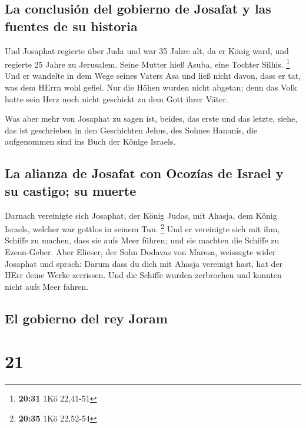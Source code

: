 \hypertarget{la-conclusiuxf3n-del-gobierno-de-josafat-y-las-fuentes-de-su-historia}{%
\subsection{La conclusión del gobierno de Josafat y las fuentes de su
historia}\label{la-conclusiuxf3n-del-gobierno-de-josafat-y-las-fuentes-de-su-historia}}

 Und Josaphat regierte über Juda und war 35 Jahre alt, da
er König ward, und regierte 25 Jahre zu Jerusalem. Seine Mutter hieß
Asuba, eine Tochter Silhis. \footnote{\textbf{20:31} 1Kö 22,41-51}
 Und er wandelte in dem Wege seines Vaters Asa und ließ
nicht davon, dass er tat, was dem HErrn wohl gefiel.  Nur
die Höhen wurden nicht abgetan; denn das Volk hatte sein Herz noch nicht
geschickt zu dem Gott ihrer Väter.

 Was aber mehr von Josaphat zu sagen ist, beides, das
erste und das letzte, siehe, das ist geschrieben in den Geschichten
Jehus, des Sohnes Hananis, die aufgenommen sind ins Buch der Könige
Israels.

\hypertarget{la-alianza-de-josafat-con-ocozuxedas-de-israel-y-su-castigo-su-muerte}{%
\subsection{La alianza de Josafat con Ocozías de Israel y su castigo; su
muerte}\label{la-alianza-de-josafat-con-ocozuxedas-de-israel-y-su-castigo-su-muerte}}

 Darnach vereinigte sich Josaphat, der König Judas, mit
Ahasja, dem König Israels, welcher war gottlos in seinem Tun.
\footnote{\textbf{20:35} 1Kö 22,52-54}  Und er vereinigte
sich mit ihm, Schiffe zu machen, dass sie aufs Meer führen; und sie
machten die Schiffe zu Ezeon-Geber.  Aber Elieser, der
Sohn Dodavas von Maresa, weissagte wider Josaphat und sprach: Darum dass
du dich mit Ahasja vereinigt hast, hat der HErr deine Werke zerrissen.
Und die Schiffe wurden zerbrochen und konnten nicht aufs Meer fahren.

\hypertarget{el-gobierno-del-rey-joram}{%
\subsection{El gobierno del rey Joram}\label{el-gobierno-del-rey-joram}}

\hypertarget{section-20}{%
\section{21}\label{section-20}}

